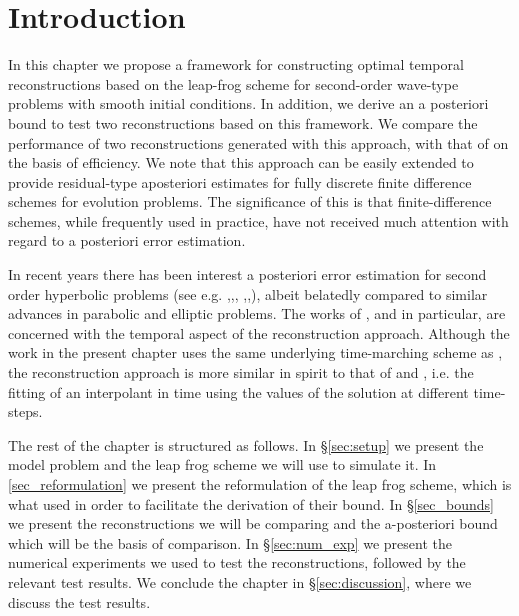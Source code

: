\documentclass[12pt,a4paper]{article}
\numberwithin{equation}{section}
\theoremstyle{definition}
\begin{document}
\section{Introduction}\label{sec_intro}



In this chapter we propose a framework for constructing optimal temporal reconstructions based on the leap-frog scheme for second-order wave-type problems with smooth initial conditions.  In addition, we derive an a posteriori bound to test two reconstructions based on this framework.  We compare the performance of two reconstructions generated with this approach, with that of \cite{georgoulis2016posteriori} on the basis of efficiency.  We note that this approach can be easily extended to provide residual-type aposteriori estimates for fully discrete finite difference schemes for evolution problems.  The significance of this is that finite-difference schemes, while frequently used in practice, have not received much attention with regard to a posteriori error estimation.

In recent years there has been interest a posteriori error estimation for second order hyperbolic problems (see e.g. \cite{bernardi2005time},\cite{georgoulis2013posteriori},\cite{georgoulis2016posteriori}, \cite{gorynina2018elements},\cite{gorynina2019time},\cite{gorynina2019easily}), albeit belatedly compared to similar advances in parabolic and elliptic problems. The works of \cite{georgoulis2016posteriori}, \cite{gorynina2019time} and  \cite{gorynina2019easily} in particular, are concerned with the temporal aspect of the reconstruction approach.  Although the work in the present chapter uses the same underlying time-marching scheme as \cite{georgoulis2016posteriori}, the reconstruction approach is more similar in spirit to that of  \cite{gorynina2019easily} and \cite{gorynina2019time}, i.e. the fitting of an interpolant in time using the values of the solution at different time-steps.


The rest of the chapter is structured as follows.  In \S \ref{sec:setup} we present the model problem and the leap frog scheme we will use to simulate it.  In \ref{sec_reformulation} we present the reformulation of the leap frog scheme, which is what  \cite{georgoulis2016posteriori} used in order to facilitate the derivation of their bound.  In \S \ref{sec_bounds} we present the reconstructions we will be comparing and the a-posteriori bound which will be the basis of comparison.   In \S \ref{sec:num_exp} we present the numerical experiments we used to test the reconstructions, followed by the relevant test results.  We conclude the chapter in \S \ref{sec:discussion}, where we  discuss the test results.
\end{document}
